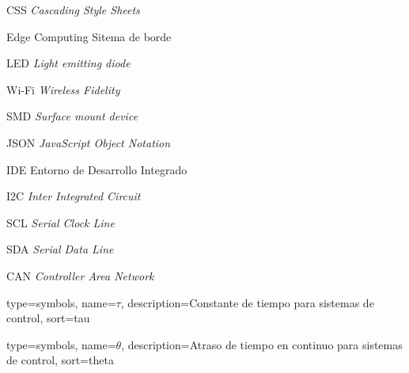             {CSS} %
            {\textit{Cascading Style Sheets}} %
            
            {Edge Computing} %
            {Sitema de borde} %

            {LED} %
            {\textit{Light emitting diode}} %

            {Wi-Fi} %
            {\textit{Wireless Fidelity}} %

            {SMD} %
            {\textit{Surface mount device}} %
            
            {JSON} %
            {\textit{JavaScript Object Notation}} %

            {IDE} %
            {Entorno de Desarrollo Integrado} %

            {I2C} %
            {\textit{Inter Integrated Circuit}} %
            
            {SCL} %
            {\textit{Serial Clock Line}} %
            
            {SDA} %
            {\textit{Serial Data Line}} %

            {CAN} %
            {\textit{Controller Area Network}} %
            

{
    type=symbols,   %
    name={\ensuremath{\tau}}, %
    description={Constante de tiempo para sistemas de control}, %
    sort=tau %
}

{
    type=symbols,
    name={\ensuremath{\theta}},
    description={Atraso de tiempo en continuo para sistemas de control},
    sort=theta
}